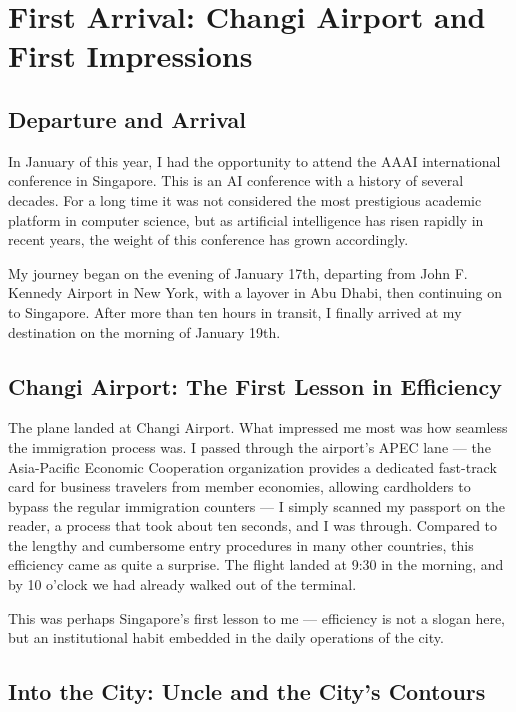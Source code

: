 \chapter{First Arrival: Changi Airport and First Impressions}

\section{Departure and Arrival}

In January of this year, I had the opportunity to attend the AAAI international conference in Singapore. This is an AI conference with a history of several decades. For a long time it was not considered the most prestigious academic platform in computer science, but as artificial intelligence has risen rapidly in recent years, the weight of this conference has grown accordingly.

My journey began on the evening of January 17th, departing from John F. Kennedy Airport in New York, with a layover in Abu Dhabi, then continuing on to Singapore. After more than ten hours in transit, I finally arrived at my destination on the morning of January 19th.

\section{Changi Airport: The First Lesson in Efficiency}

The plane landed at Changi Airport. What impressed me most was how seamless the immigration process was. I passed through the airport's APEC lane --- the Asia-Pacific Economic Cooperation organization provides a dedicated fast-track card for business travelers from member economies, allowing cardholders to bypass the regular immigration counters --- I simply scanned my passport on the reader, a process that took about ten seconds, and I was through. Compared to the lengthy and cumbersome entry procedures in many other countries, this efficiency came as quite a surprise. The flight landed at 9:30 in the morning, and by 10 o'clock we had already walked out of the terminal.

This was perhaps Singapore's first lesson to me --- efficiency is not a slogan here, but an institutional habit embedded in the daily operations of the city.

\section{Into the City: Uncle and the City's Contours}


